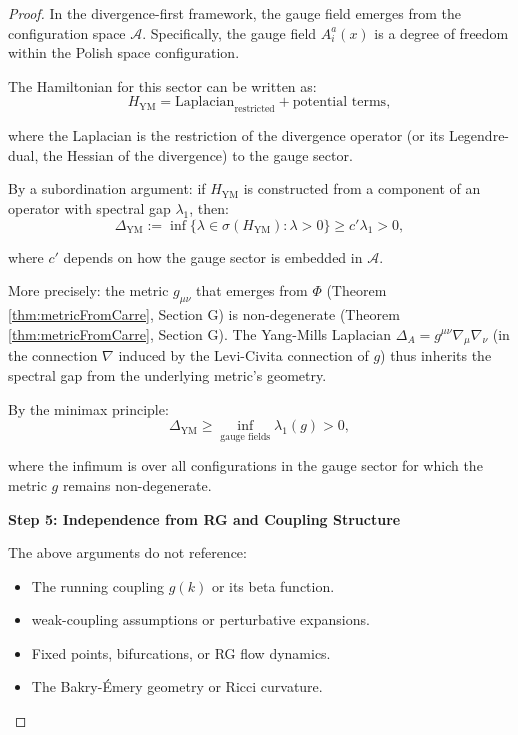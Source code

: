 \begin{lemma}
\begin{proof}
In the divergence-first framework, the gauge field emerges from the configuration space $\mathcal{A}$. Specifically, the gauge field $A_i^a(x)$ is a degree of freedom within the Polish space configuration.

The Hamiltonian for this sector can be written as:
\begin{equation}
H_{\text{YM}} = \text{Laplacian}_{\text{restricted}} + \text{potential terms},
\end{equation}

where the Laplacian is the restriction of the divergence operator (or its Legendre-dual, the Hessian of the divergence) to the gauge sector.

By a subordination argument: if $H_{\text{YM}}$ is constructed from a component of an operator with spectral gap $\lambda_1$, then:
\begin{equation}
\Delta_{\text{YM}} := \inf\{\lambda \in \sigma(H_{\text{YM}}) : \lambda > 0\} \geq c' \lambda_1 > 0,
\end{equation}

where $c'$ depends on how the gauge sector is embedded in $\mathcal{A}$.

More precisely: the metric $g_{\mu\nu}$ that emerges from $\Phi$ (Theorem \ref{thm:metricFromCarre}, Section G) is non-degenerate (Theorem \ref{thm:metricFromCarre}, Section G). The Yang-Mills Laplacian $\Delta_A = g^{\mu\nu} \nabla_\mu \nabla_\nu$ (in the connection $\nabla$ induced by the Levi-Civita connection of $g$) thus inherits the spectral gap from the underlying metric's geometry.

By the minimax principle:
\begin{equation}
\Delta_{\text{YM}} \geq \inf_{\text{gauge fields}} \lambda_1(g) > 0,
\end{equation}

where the infimum is over all configurations in the gauge sector for which the metric $g$ remains non-degenerate.

\textbf{Step 5: Independence from RG and Coupling Structure}

The above arguments do not reference:

\begin{itemize}

\item The running coupling $g(k)$ or its beta function.
\item weak-coupling assumptions or perturbative expansions.
\item Fixed points, bifurcations, or RG flow dynamics.
\item The Bakry-Émery geometry or Ricci curvature.


\end{itemize}
\end{proof}
\end{lemma}
